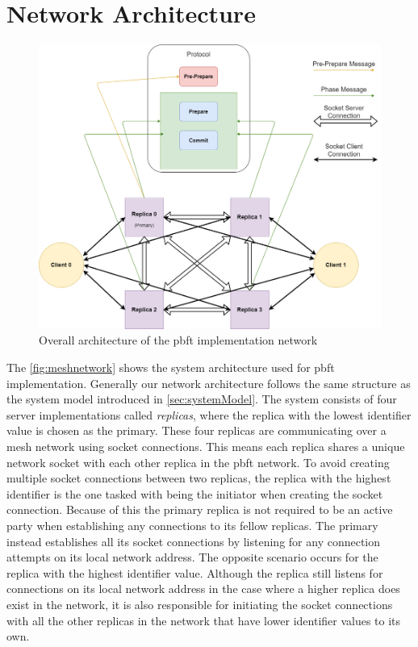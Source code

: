 \section{Network Architecture}
\begin{figure}
	\centering
	\includegraphics[width=\linewidth]{figures/meshnetwork}
	\caption{Overall architecture of the \ac{pbft} implementation network}
	\label{fig:meshnetwork}
\end{figure}
The \autoref{fig:meshnetwork} shows the system architecture used for \ac{pbft} implementation. Generally our network architecture follows the same structure as the system model introduced in \autoref{sec:systemModel}. The system consists of four server implementations called \emph{replicas}, where the replica with the lowest identifier value is chosen as the primary. These four replicas are communicating over a mesh network using socket connections. This means each replica shares a unique network socket with each other replica in the \ac{pbft} network. To avoid creating multiple socket connections between two replicas, the replica with the highest identifier is the one tasked with being the initiator when creating the socket connection. Because of this the primary replica is not required to be an active party when establishing any connections to its fellow replicas. The primary instead establishes all its socket connections by listening for any connection attempts on its local network address. The opposite scenario occurs for the replica with the highest identifier value. Although the replica still listens for connections on its local network address in the case where a higher replica does exist in the network, it is also responsible for initiating the socket connections with all the other replicas in the network that have lower identifier values to its own.


